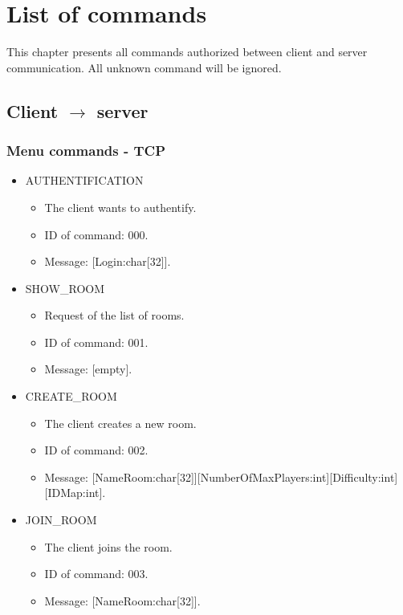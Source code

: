 \documentclass[a4 paper, 12pt]{report}
\begin{document}
\chapter{List of commands}
This chapter presents all commands authorized between client and server communication. All unknown command will be ignored.

\section{Client $\rightarrow$ server}
\subsection{Menu commands - TCP}
\begin{itemize}
\item AUTHENTIFICATION
  \begin{itemize}
  \item The client wants to authentify.
  \item ID of command: 000.
  \item Message: [Login:char[32]].
  \end{itemize}

\item SHOW\_ROOM
  \begin{itemize}
  \item Request of the list of rooms.
  \item ID of command: 001.
  \item Message: [empty].
  \end{itemize}

\item CREATE\_ROOM
  \begin{itemize}
  \item The client creates a new room.
  \item ID of command: 002.
  \item Message: [NameRoom:char[32]][NumberOfMaxPlayers:int][Difficulty:int][IDMap:int].
  \end{itemize}

\item JOIN\_ROOM
  \begin{itemize}
  \item The client joins the room.
  \item ID of command: 003.
  \item Message: [NameRoom:char[32]].
  \end{itemize}

\newpage


\end{itemize}
\end{document}
